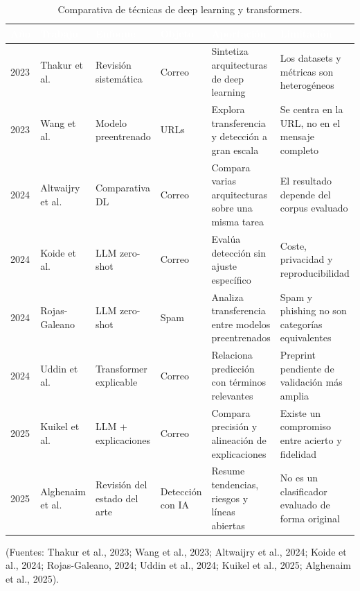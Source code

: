 \documentclass[11pt,a4paper,oneside]{report}
\begin{document}
\begingroup
\begin{table}[htbp]
  \centering
  \small
  \caption{Comparativa de técnicas de deep learning y transformers.}
  \label{tab:3-2}
  \begin{tabularx}{\textwidth}{|X|X|X|X|X|X|}
    \hline
    \rowcolor{uemcgreen}
    \textcolor{white}{\textbf{Año}} & \textcolor{white}{\textbf{Trabajo}} & \textcolor{white}{\textbf{Enfoque}} & \textcolor{white}{\textbf{Objeto}} & \textcolor{white}{\textbf{Aportación}} & \textcolor{white}{\textbf{Limitación}} \\
    \hline
    2023 & Thakur et al. & Revisión sistemática & Correo & Sintetiza arquitecturas de deep learning & Los datasets y métricas son heterogéneos \\
    \hline
    \rowcolor{tablelight}
    2023 & Wang et al. & Modelo preentrenado & URLs & Explora transferencia y detección a gran escala & Se centra en la URL, no en el mensaje completo \\
    \hline
    2024 & Altwaijry et al. & Comparativa DL & Correo & Compara varias arquitecturas sobre una misma tarea & El resultado depende del corpus evaluado \\
    \hline
    \rowcolor{tablelight}
    2024 & Koide et al. & LLM zero-shot & Correo & Evalúa detección sin ajuste específico & Coste, privacidad y reproducibilidad \\
    \hline
    2024 & Rojas-Galeano & LLM zero-shot & Spam & Analiza transferencia entre modelos preentrenados & Spam y phishing no son categorías equivalentes \\
    \hline
    \rowcolor{tablelight}
    2024 & Uddin et al. & Transformer explicable & Correo & Relaciona predicción con términos relevantes & Preprint pendiente de validación más amplia \\
    \hline
    2025 & Kuikel et al. & LLM + explicaciones & Correo & Compara precisión y alineación de explicaciones & Existe un compromiso entre acierto y fidelidad \\
    \hline
    \rowcolor{tablelight}
    2025 & Alghenaim et al. & Revisión del estado del arte & Detección con IA & Resume tendencias, riesgos y líneas abiertas & No es un clasificador evaluado de forma original \\
    \hline
  \end{tabularx}
\end{table}
\endgroup

\begin{center}
  \footnotesize (Fuentes: Thakur et al., 2023; Wang et al., 2023; Altwaijry et al., 2024; Koide et al., 2024; Rojas-Galeano, 2024; Uddin et al., 2024; Kuikel et al., 2025; Alghenaim et al., 2025).
\end{center}
\end{document}
